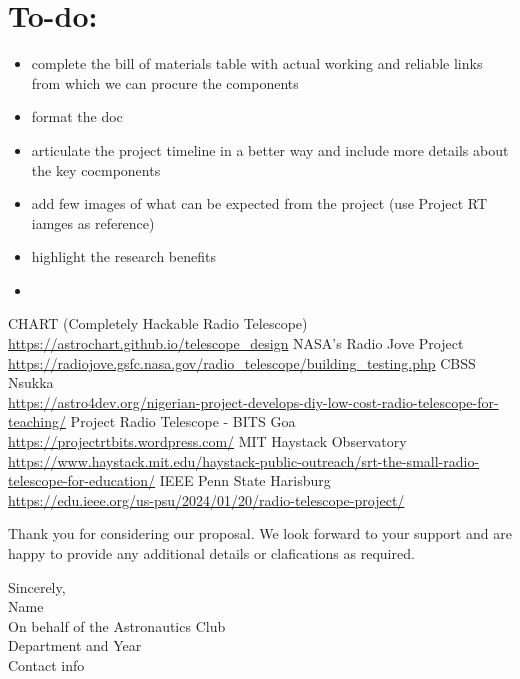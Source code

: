 \documentclass[12pt]{report}
\begin{document}
\section*{To-do:}
\begin{itemize}
    \item complete the bill of materials table with actual working and reliable links from which we can procure the components
    \item format the doc
    \item articulate the project timeline in a better way and include more details about the key cocmponents
    \item add few images of what can be expected from the project (use Project RT iamges as reference)
    \item highlight the research benefits 
    \item 
\end{itemize}

\begin{thebibliography}{9}
CHART (Completely Hackable Radio Telescope) \\
\url{https://astrochart.github.io/telescope_design}
NASA's Radio Jove Project \\
\url{https://radiojove.gsfc.nasa.gov/radio_telescope/building_testing.php}
CBSS Nsukka \\
\url{https://astro4dev.org/nigerian-project-develops-diy-low-cost-radio-telescope-for-teaching/}
Project Radio Telescope - BITS Goa \\
\url{https://projectrtbits.wordpress.com/}
MIT Haystack Observatory \\
\url{https://www.haystack.mit.edu/haystack-public-outreach/srt-the-small-radio-telescope-for-education/}
IEEE Penn State Harisburg \\
\url{https://edu.ieee.org/us-psu/2024/01/20/radio-telescope-project/}
\end{thebibliography}
\begin{flushleft}
    Thank you for considering our proposal. We look forward to your support and are happy to provide any additional details or clafications as required. \\ \vspace{1em}

    Sincerely,\\ 
    Name \\
    On behalf of the Astronautics Club\\
    Department and Year \\
    Contact info
\end{flushleft}
\end{document}
